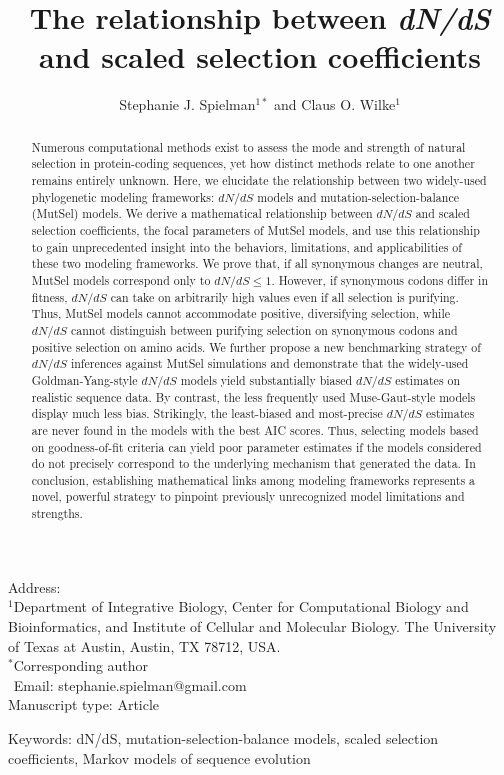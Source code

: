 \documentclass[11pt]{article}
\begin{document}
	
\title{\textbf{The relationship between \emph{dN/dS} and scaled selection coefficients}}
\author{Stephanie J. Spielman$^{1*}$ and Claus O. Wilke$^{1}$}
\date{}

\maketitle
\noindent
Address:\\
$^1$Department of Integrative Biology, Center for Computational Biology and Bioinformatics, and Institute of Cellular and Molecular Biology.
The University of Texas at Austin, Austin, TX 78712, USA.\\

\bigskip
\noindent
$^*$Corresponding author\\
$\phantom{^*}$Email: stephanie.spielman@gmail.com\\
	
\bigskip
\noindent
Manuscript type: Article

\bigskip
\noindent Keywords: dN/dS, mutation-selection-balance models, scaled selection coefficients, Markov models of sequence evolution

	
\newpage
\begin{abstract}
Numerous computational methods exist to assess the mode and strength of natural selection in protein-coding sequences, yet how distinct methods relate to one another remains entirely unknown. Here, we elucidate the relationship between two widely-used phylogenetic modeling frameworks: $dN/dS$ models and mutation-selection-balance (MutSel) models. We derive a mathematical relationship between $dN/dS$ and scaled selection coefficients, the focal parameters of MutSel models, and use this relationship to gain unprecedented insight into the behaviors, limitations, and applicabilities of these two modeling frameworks. We prove that, if all synonymous changes are neutral, MutSel models correspond only to $dN/dS \leq 1$. However, if synonymous codons differ in fitness, $dN/dS$ can take on arbitrarily high values even if all selection is purifying. Thus, MutSel models cannot accommodate positive, diversifying selection, while $dN/dS$ cannot distinguish between purifying selection on synonymous codons and positive selection on amino acids. We further propose a new benchmarking strategy of $dN/dS$ inferences against MutSel simulations and demonstrate that the widely-used Goldman-Yang-style $dN/dS$ models yield substantially biased $dN/dS$ estimates on realistic sequence data. By contrast, the less frequently used Muse-Gaut-style models display much less bias. Strikingly, the least-biased and most-precise $dN/dS$ estimates are never found in the models with the best AIC scores. Thus, selecting models based on goodness-of-fit criteria can yield poor parameter estimates if the models considered do not precisely correspond to the underlying mechanism that generated the data. In conclusion, establishing mathematical links among modeling frameworks represents a novel, powerful strategy to pinpoint previously unrecognized model limitations and strengths.
\end{abstract}
\end{document}
